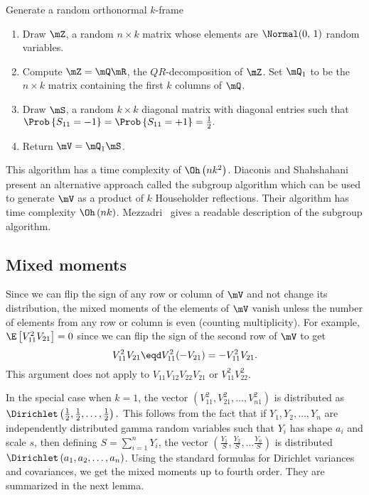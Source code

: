 \begin{algorithm}
    \caption{\label{A:random-steifel}Generate a random orthonormal $k$-frame}
    \begin{enumerate}
        \item Draw $\mZ$, a random $n \times k$ matrix whose elements are 
              \iid $\Normal( 0, \, 1 )$ random variables.
              
        \item Compute $\mZ = \mQ \mR$, the $QR$-decomposition of $\mZ$.
              Set $\mQ_1$ to be the $n \times k$ matrix containing the
              first $k$ columns of $\mQ$.

        \item Draw $\mS$, a random $k \times k$ diagonal matrix with \iid 
              diagonal entries such that 
              \(
                  \Prob\left\{ S_{11} = -1 \right\}
                  =
                  \Prob\left\{ S_{11} = +1 \right\}
                  =
                  \frac{1}{2}.
              \)
        \item Return $\mV = \mQ_1 \mS$.
    \end{enumerate}
\end{algorithm}

\noindent 
This algorithm has a time complexity of $\Oh\left( n k^2 \right)$. Diaconis
and Shahshahani~\cite{diaconis1987sag} present an alternative approach called
the subgroup algorithm which can be used to generate $\mV$ as a product of 
$k$ Householder reflections.  Their algorithm has time complexity 
$\Oh\left( n k \right)$.  Mezzadri~\cite{mezzadri2007grm} gives a readable 
description of the subgroup algorithm.


\subsection{Mixed moments}

Since we can flip the sign of any row or column of $\mV$ and not change
its distribution, the mixed moments of the elements of $\mV$ vanish unless 
the number of elements from any row or column is even (counting multiplicity).  For example, $\E \left[ V_{11}^2 V_{21} \right] = 0$ since we can flip the sign of the second row of $\mV$ to get
\[
    V_{11}^2 V_{21} 
    \eqd
    V_{11}^2 (- V_{21})
    =
    -V_{11}^2 V_{21}.
\]
This argument does not apply to $V_{11} V_{12} V_{22} V_{21}$ or
$V_{11}^2 V_{22}^2$.


In the special case when $k = 1$, the vector
\(
    \left(
        V_{11}^2, V_{21}^2, \ldots, V_{n1}^2
    \right)
\)
is distributed as 
\(
    \Dirichlet\left( \frac{1}{2}, \frac{1}{2}, \ldots, \frac{1}{2} \right).
\)
This follows from the fact that if $Y_1, Y_2, \ldots, Y_n$ are independently distributed gamma random variables such that $Y_i$ has shape
$a_i$ and scale $s$, then defining $S = \sum_{i=1}^n Y_i$, the vector
\(
    \left(
        \frac{Y_1}{S},
        \frac{Y_2}{S},
        \ldots
        \frac{Y_n}{S}
    \right)
\)
is distributed $\Dirichlet\left( a_1, a_2, \ldots, a_n \right)$.  Using
the standard formulas for Dirichlet variances and covariances, we get
the mixed moments up to fourth order.  They are summarized in the next
lemma.

